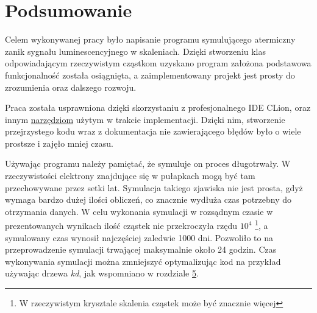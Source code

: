 \chapter{Podsumowanie}

Celem wykonywanej pracy było napisanie programu symulującego atermiczny zanik sygnału luminescencyjnego w skaleniach. Dzięki stworzeniu klas odpowiadającym rzeczywistym cząstkom uzyskano program założona podstawowa funkcjonalność została osiągnięta, a zaimplementowany projekt jest prosty do zrozumienia oraz dalszego rozwoju. 

Praca została usprawniona dzięki skorzystaniu z profesjonalnego IDE CLion, oraz innym \hyperref[tech:all]{narzędziom} użytym w trakcie implementacji. Dzięki nim, stworzenie przejrzystego kodu wraz z dokumentacja nie zawierającego błędów było o wiele prostsze i zajęło mniej czasu.

Używając programu należy pamiętać, że symuluje on proces długotrwały. W rzeczywistości elektrony znajdujące się w pułapkach mogą być tam przechowywane przez setki lat. Symulacja takiego zjawiska nie jest prosta, gdyż wymaga bardzo dużej ilości obliczeń, co znacznie wydłuża czas potrzebny do otrzymania danych. W celu wykonania symulacji w rozsądnym czasie w  prezentowanych wynikach ilość cząstek nie przekroczyła rzędu $10^{4}$ \footnote[7]{W rzeczywistym krysztale skalenia cząstek może być znacznie więcej}, a symulowany czas wynosił najczęściej zaledwie 1000 dni. Pozwoliło to na przeprowadzenie symulacji trwającej maksymalnie około 24 godzin. Czas wykonywania symulacji można zmniejszyć optymalizując kod na przykład używając drzewa \emph{kd}, jak wspomniano w rozdziale \hyperref[rozwoj:1]{5}. 

